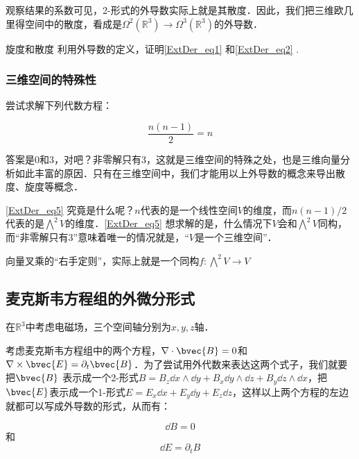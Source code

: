 观察结果的系数可见，2-形式的外导数实际上就是其散度．因此，我们把三维欧几里得空间中的散度，看成是$\Omega^2(\mathbb{R}^3)\rightarrow\Omega^3(\mathbb{R}^3)$的外导数．

\begin{exercise}{旋度和散度}
利用外导数的定义，证明\autoref{ExtDer_eq1} 和\autoref{ExtDer_eq2} .
\end{exercise}

\subsubsection{三维空间的特殊性}

尝试求解下列代数方程：

\begin{equation}\label{ExtDer_eq5}
\frac{n(n-1)}{2}=n
\end{equation}

答案是$0$和$3$，对吧？非零解只有$3$，这就是三维空间的特殊之处，也是三维向量分析如此丰富的原因．只有在三维空间中，我们才能用以上外导数的概念来导出散度、旋度等概念．

\autoref{ExtDer_eq5} 究竟是什么呢？$n$代表的是一个线性空间$V$的维度，而$n(n-1)/2$代表的是$\bigwedge^2 V$的维度．\autoref{ExtDer_eq5} 想求解的是，什么情况下$V$会和$\bigwedge^2 V$同构，而“非零解只有$3$”意味着唯一的情况就是，“$V$是一个三维空间”．

向量叉乘的“右手定则”，实际上就是一个同构$f:\bigwedge^2 V\rightarrow V$



\subsection{麦克斯韦方程组的外微分形式}



在$\mathbb{R}^3$中考虑电磁场，三个空间轴分别为$x, y, z$轴．

考虑麦克斯韦方程组中的两个方程，$\nabla\cdot\bvec{B}=0$和$\nabla\times\bvec{E}=\partial_t\bvec{B}$．为了尝试用外代数来表达这两个式子，我们就要把$\bvec{B}$
表示成一个2-形式$B=B_z\dd x\wedge\dd y+B_x\dd y\wedge\dd z+B_y\dd z\wedge\dd x$，把$\bvec{E}$表示成一个1-形式$E=E_x\dd x+E_y\dd y+E_z\dd z$，这样以上两个方程的左边就都可以写成外导数的形式，从而有：

\begin{equation}\label{ExtDer_eq3}
\dd B=0
\end{equation}
和
\begin{equation}\label{ExtDer_eq4}
\dd E=\partial_tB
\end{equation}

